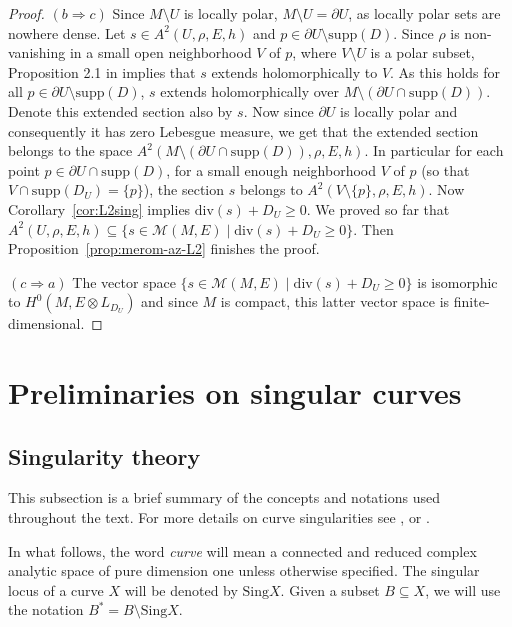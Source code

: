 \documentclass[11pt]{amsart}
\theoremstyle{definition}
\begin{document}
\begin{proof}
     $(b\Longrightarrow c)$
     Since $M \setminus U$
     is locally polar, $M\setminus U= \partial U$, as locally polar sets are nowhere dense. Let $s \in A^2(U,\rho,E,h)$ and $p \in \partial U \setminus \text{supp}(D)$. Since $\rho$ is non-vanishing in a small open neighborhood $V$ of $p$, where $V\setminus U$
   is a polar subset,  Proposition 2.1 in \cite{Sz22} implies that $s$ extends holomorphically to $V$. As this holds for all $p \in \partial U \setminus \text{supp}(D)$, $s$ extends holomorphically over $M \setminus (\partial U\cap \text{supp}(D))$. Denote this extended section also by $s$.
   Now since $\partial U$ is locally polar and consequently it has zero Lebesgue measure, 
   we get that the extended section belongs to the space
   $ A^2(M\setminus(\partial U\cap \text{supp}(D)),\rho,E,h)$. In particular for each 
    point $p \in \partial U \cap \text{supp}(D)$, for a small enough neighborhood $V$ of $p$ (so that $V\cap\text{supp}(D_U)=\{p\}$), the section $s$ belongs to $A^2(V\setminus\{p\},\rho,E,h)$. Now Corollary~\ref{cor:L2sing} implies  $\text{div}(s)+D_U\ge0$.
   We proved  so far that $A^2(U,\rho,E,h) \subseteq \{s\in \mathcal M(M,E)\mid \text{div}(s)+D_{ U}\ge0\}$.  Then 
   Proposition~\ref{prop:merom-az-L2} finishes the proof.

   $(c\Longrightarrow a)$
   The vector space
   $\{s\in \mathcal M(M,E)\mid \text{div}(s)+D_U\ge0\}$ is isomorphic to
   $H^0(M,E\otimes L_{D_U})$ and since $M$ is compact, this latter vector space is finite-dimensional.
\end{proof}


\section{Preliminaries on singular curves}

\subsection{Singularity theory} This subsection is a brief summary of the concepts and notations used throughout the text. For more details on curve singularities see \cite{Wa04}, \cite{GLS07} or \cite{dJP13}.\vspace{3mm}

\noindent In what follows, the word \emph{curve} will mean a connected and reduced complex analytic space of pure dimension one unless otherwise specified. The singular locus of  a curve $X$ will be denoted by $\text{Sing}X$. Given a subset $B\subseteq X$, we will use the notation $B^* = B \setminus \text{Sing}X$.
\end{document}
